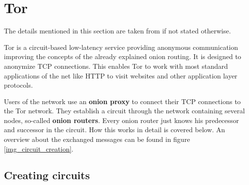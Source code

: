 





\section{Tor}

The details mentioned in this section are taken from \cite{tor2004original} if not stated otherwise.

Tor is a circuit-based low-latency service providing anonymous communication improving the concepts of the already explained onion routing. It is designed to anonymize TCP connections. This enables Tor to work with most standard applications of the net like HTTP to visit websites and other application layer protocols.

Users of the network use an \textbf{onion proxy} to connect their TCP connections to the Tor network. They establish a circuit through the network containing several nodes, so-called \textbf{onion routers}. Every onion router just knows his predecessor and successor in the circuit. How this works in detail is covered below. An overview about the exchanged messages can be found in figure  \ref{img_circuit_creation}.

\subsection{Creating circuits}

